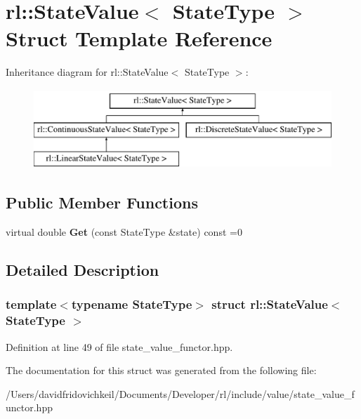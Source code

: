 \hypertarget{structrl_1_1_state_value}{}\section{rl\+:\+:State\+Value$<$ State\+Type $>$ Struct Template Reference}
\label{structrl_1_1_state_value}
Inheritance diagram for rl\+:\+:State\+Value$<$ State\+Type $>$\+:\begin{figure}[H]
\begin{center}
\leavevmode
\includegraphics[height=3.000000cm]{structrl_1_1_state_value}
\end{center}
\end{figure}
\subsection*{Public Member Functions}
\begin{DoxyCompactItemize}
\item 
\hypertarget{structrl_1_1_state_value_a0e0e583e7ec1ef054f16f13dabbec6a7}{}\label{structrl_1_1_state_value_a0e0e583e7ec1ef054f16f13dabbec6a7} 
virtual double {\bfseries Get} (const State\+Type \&state) const =0
\end{DoxyCompactItemize}


\subsection{Detailed Description}
\subsubsection*{template$<$typename State\+Type$>$\newline
struct rl\+::\+State\+Value$<$ State\+Type $>$}



Definition at line 49 of file state\+\_\+value\+\_\+functor.\+hpp.



The documentation for this struct was generated from the following file\+:\begin{DoxyCompactItemize}
\item 
/\+Users/davidfridovichkeil/\+Documents/\+Developer/rl/include/value/state\+\_\+value\+\_\+functor.\+hpp\end{DoxyCompactItemize}
